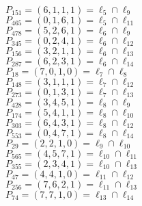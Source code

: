 \documentclass{article}
\begin{document}
{\begin{multicols}{2}
$P_{151} = ( 6, 1, 1, 1 ) = \ell_{5} \cap \ell_{9} $\\
$P_{465} = ( 0, 1, 6, 1 ) = \ell_{5} \cap \ell_{11} $\\
$P_{478} = ( 5, 2, 6, 1 ) = \ell_{6} \cap \ell_{9} $\\
$P_{345} = ( 0, 2, 4, 1 ) = \ell_{6} \cap \ell_{12} $\\
$P_{156} = ( 3, 2, 1, 1 ) = \ell_{6} \cap \ell_{13} $\\
$P_{287} = ( 6, 2, 3, 1 ) = \ell_{6} \cap \ell_{14} $\\
$P_{18} = ( 7, 0, 1, 0 ) = \ell_{7} \cap \ell_{8} $\\
$P_{148} = ( 3, 1, 1, 1 ) = \ell_{7} \cap \ell_{12} $\\
$P_{273} = ( 0, 1, 3, 1 ) = \ell_{7} \cap \ell_{13} $\\
$P_{428} = ( 3, 4, 5, 1 ) = \ell_{8} \cap \ell_{9} $\\
$P_{174} = ( 5, 4, 1, 1 ) = \ell_{8} \cap \ell_{10} $\\
$P_{303} = ( 6, 4, 3, 1 ) = \ell_{8} \cap \ell_{12} $\\
$P_{553} = ( 0, 4, 7, 1 ) = \ell_{8} \cap \ell_{14} $\\
$P_{29} = ( 2, 2, 1, 0 ) = \ell_{9} \cap \ell_{10} $\\
$P_{565} = ( 4, 5, 7, 1 ) = \ell_{10} \cap \ell_{11} $\\
$P_{355} = ( 2, 3, 4, 1 ) = \ell_{10} \cap \ell_{13} $\\
$P_{47} = ( 4, 4, 1, 0 ) = \ell_{11} \cap \ell_{12} $\\
$P_{256} = ( 7, 6, 2, 1 ) = \ell_{11} \cap \ell_{13} $\\
$P_{74} = ( 7, 7, 1, 0 ) = \ell_{13} \cap \ell_{14} $\\
\end{multicols}
}
\end{document}
